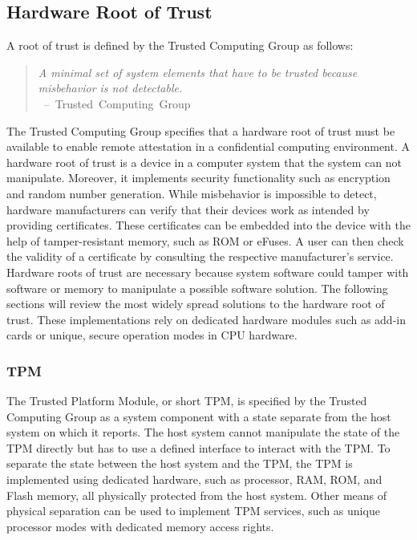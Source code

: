 
\subsection{Hardware Root of Trust}
\label{sec:20:hardware_root_of_trust}
A root of trust is defined by the Trusted Computing Group as follows:
\begin{quote}
    \textit{ A minimal set of system elements that have to be trusted because
        misbehavior is not detectable. \\
    } \mbox{ -- Trusted Computing Group\cite{tpm_architecture}}
\end{quote}

The Trusted Computing Group specifies that a hardware root of trust must be
available to enable remote attestation in a confidential computing
environment.\cite{tpm_architecture} A hardware root of trust is a device in a
computer system that the system can not manipulate. Moreover, it implements
security functionality such as encryption and random number generation. While
misbehavior is impossible to detect, hardware manufacturers can verify that
their devices work as intended by providing certificates. These certificates can
be embedded into the device with the help of tamper-resistant memory, such as
ROM or eFuses. A user can then check the validity of a certificate by consulting
the respective manufacturer's service. \\

Hardware roots of trust are necessary because system software could tamper with
software or memory to manipulate a possible software solution. The following
sections will review the most widely spread solutions to the hardware root of
trust. These implementations rely on dedicated hardware modules such as add-in
cards or unique, secure operation modes in CPU hardware. \\

\subsubsection{TPM}
\label{sec:20:tpm}
The Trusted Platform Module, or short TPM, is specified by the Trusted Computing
Group as a system component with a state separate from the host system on which
it reports.\cite{tpm_architecture} The host system cannot manipulate the state
of the TPM directly but has to use a defined interface to interact with the TPM.
To separate the state between the host system and the TPM, the TPM is
implemented using dedicated hardware, such as processor, RAM, ROM, and Flash
memory, all physically protected from the host system. Other means of physical
separation can be used to implement TPM services, such as unique processor modes
with dedicated memory access rights. \\

